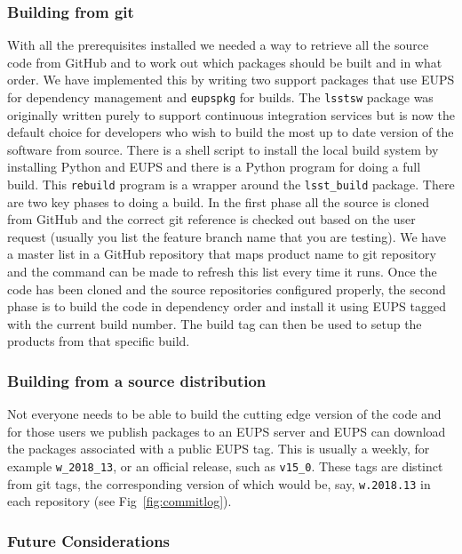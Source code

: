 \subsubsection{Building from git}

With all the prerequisites installed we needed a way to retrieve all the source code from GitHub and to work out which packages should be built and in what order.
We have implemented this by writing two support packages that use EUPS for dependency management and \texttt{eupspkg} for builds.
The \texttt{lsstsw} package was originally written purely to support continuous integration services but is now the default choice for developers who wish to build the most up to date version of the software from source.
There is a shell script to install the local build system by installing Python and EUPS and there is a Python program for doing a full build.
This \texttt{rebuild} program is a wrapper around the \texttt{lsst\_build} package.
There are two key phases to doing a build.
In the first phase all the source is cloned from GitHub and the correct git reference is checked out based on the user request (usually you list the feature branch name that you are testing).
We have a master list in a GitHub repository that maps product name to git repository and the command can be made to refresh this list every time it runs.
Once the code has been cloned and the source repositories configured properly, the second phase is to build the code in dependency order and install it using EUPS tagged with the current build number.
The build tag can then be used to setup the products from that specific build.

\subsubsection{Building from a source distribution}

Not everyone needs to be able to build the cutting edge version of the code and for those users we publish packages to an EUPS server and EUPS can download the packages associated with a public EUPS tag.
This is usually a weekly, for example \texttt{w\_2018\_13}, or an official release, such as \texttt{v15\_0}.
These tags are distinct from git tags, the corresponding version of which would be, say, \texttt{w.2018.13} in each repository (see Fig~\ref{fig:commitlog}).

\subsubsection{Future Considerations}

